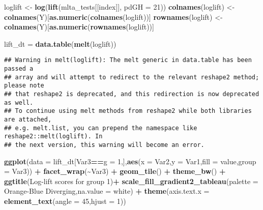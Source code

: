 \documentclass[
]{article}
\newenvironment{Shaded}{\begin{snugshade}}{\end{snugshade}}
\newcommand{\DataTypeTok}[1]{\textcolor[rgb]{0.13,0.29,0.53}{#1}}
\newcommand{\DecValTok}[1]{\textcolor[rgb]{0.00,0.00,0.81}{#1}}
\newcommand{\KeywordTok}[1]{\textcolor[rgb]{0.13,0.29,0.53}{\textbf{#1}}}
\newcommand{\NormalTok}[1]{#1}
\newcommand{\OperatorTok}[1]{\textcolor[rgb]{0.81,0.36,0.00}{\textbf{#1}}}
\newcommand{\StringTok}[1]{\textcolor[rgb]{0.31,0.60,0.02}{#1}}
\begin{document}
\begin{Shaded}
\begin{Highlighting}[]
\NormalTok{loglift \textless{}{-}}\StringTok{ }\KeywordTok{log}\NormalTok{(}\KeywordTok{lift}\NormalTok{(mlta\_tests[[index]], }\DataTypeTok{pdGH =} \DecValTok{21}\NormalTok{))}
\KeywordTok{colnames}\NormalTok{(loglift) \textless{}{-}}\StringTok{ }\KeywordTok{colnames}\NormalTok{(Y)[}\KeywordTok{as.numeric}\NormalTok{(}\KeywordTok{colnames}\NormalTok{(loglift))]}
\KeywordTok{rownames}\NormalTok{(loglift) \textless{}{-}}\StringTok{ }\KeywordTok{colnames}\NormalTok{(Y)[}\KeywordTok{as.numeric}\NormalTok{(}\KeywordTok{rownames}\NormalTok{(loglift))]}

\NormalTok{lift\_dt =}\StringTok{ }\KeywordTok{data.table}\NormalTok{(}\KeywordTok{melt}\NormalTok{(loglift))}
\end{Highlighting}
\end{Shaded}

\begin{verbatim}
## Warning in melt(loglift): The melt generic in data.table has been passed a
## array and will attempt to redirect to the relevant reshape2 method; please note
## that reshape2 is deprecated, and this redirection is now deprecated as well.
## To continue using melt methods from reshape2 while both libraries are attached,
## e.g. melt.list, you can prepend the namespace like reshape2::melt(loglift). In
## the next version, this warning will become an error.
\end{verbatim}

\begin{Shaded}
\begin{Highlighting}[]
\KeywordTok{ggplot}\NormalTok{(}\DataTypeTok{data =}\NormalTok{ lift\_dt[Var3}\OperatorTok{==}\StringTok{\textquotesingle{}g = 1\textquotesingle{}}\NormalTok{,],}\KeywordTok{aes}\NormalTok{(}\DataTypeTok{x =}\NormalTok{ Var2,}\DataTypeTok{y =}\NormalTok{ Var1,}\DataTypeTok{fill =}\NormalTok{ value,}\DataTypeTok{group =}\NormalTok{ Var3)) }\OperatorTok{+}\StringTok{ }\KeywordTok{facet\_wrap}\NormalTok{(}\OperatorTok{\textasciitilde{}}\NormalTok{Var3) }\OperatorTok{+}\StringTok{ }\KeywordTok{geom\_tile}\NormalTok{() }\OperatorTok{+}\StringTok{ }\KeywordTok{theme\_bw}\NormalTok{() }\OperatorTok{+}\StringTok{ }
\StringTok{    }\KeywordTok{ggtitle}\NormalTok{(}\StringTok{\textquotesingle{}Log{-}lift scores for group 1\textquotesingle{}}\NormalTok{)}\OperatorTok{+}
\StringTok{  }\KeywordTok{scale\_fill\_gradient2\_tableau}\NormalTok{(}\DataTypeTok{palette =} \StringTok{\textquotesingle{}Orange{-}Blue Diverging\textquotesingle{}}\NormalTok{,}\DataTypeTok{na.value =} \StringTok{\textquotesingle{}white\textquotesingle{}}\NormalTok{) }\OperatorTok{+}\StringTok{ }\KeywordTok{theme}\NormalTok{(}\DataTypeTok{axis.text.x =} \KeywordTok{element\_text}\NormalTok{(}\DataTypeTok{angle =} \DecValTok{45}\NormalTok{,}\DataTypeTok{hjust =} \DecValTok{1}\NormalTok{))}
\end{Highlighting}
\end{Shaded}
\end{document}
